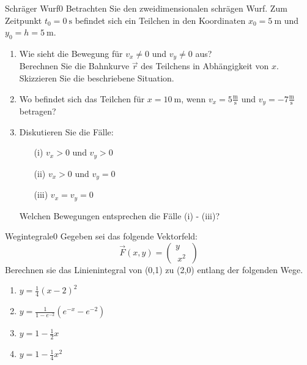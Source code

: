 \begin{exercise}{Schräger Wurf}{0}
  Betrachten Sie den zweidimensionalen schrägen Wurf.
  Zum Zeitpunkt $t_0 = \SI{0}{\second}$ befindet sich
  ein Teilchen in den Koordinaten $x_0 = \SI{5}{\meter}$ und $y_0 = h = \SI{5}{\meter}$.

    \begin{enumerate}
        \item Wie sieht die Bewegung für $v_x\neq 0$ und $v_y\neq 0$ aus?\\
        Berechnen Sie die Bahnkurve $\vec{r}$ des Teilchens in Abhängigkeit von $x$. Skizzieren Sie die beschriebene Situation.
        \item Wo befindet sich das Teilchen für $x = \SI{10}{\meter}$, wenn $v_x = \num{5}\frac{\si{\meter}}{\si{\second}}$ und $v_y = \num{-7}\frac{\si{\meter}}{\si{\second}}$ betragen?
        \item Diskutieren Sie die Fälle:
        \begin{itemize}
          \item[(i)] $v_x > 0$ und $v_y > 0$
          \item[(ii)] $v_x > 0$ und $v_y = 0$
          \item[(iii)] $v_x = v_y = 0$
        \end{itemize}
        Welchen Bewegungen entsprechen die Fälle (i) - (iii)?
    \end{enumerate}
\end{exercise}

\begin{exercise}{Wegintegrale}{0}
  Gegeben sei das folgende Vektorfeld:
  \begin{equation*}
    \vec{F}(x,y) = \left( \begin{array}{c} y\\\ x^2\  \end{array}\right)
  \end{equation*}
  Berechnen sie das Linienintegral von (0,1) zu (2,0) entlang der folgenden Wege.
  \begin{enumerate}
    \item $y = \frac{1}{4}(x-2)^2$\\
    \item $y = \frac{1}{1-e^{-2}}(e^{-x}-e^{-2})$\\
    \item $y = 1 - \frac{1}{2}x$\\
    \item $y = 1 - \frac{1}{4}x^2$
  \end{enumerate}
\end{exercise}
